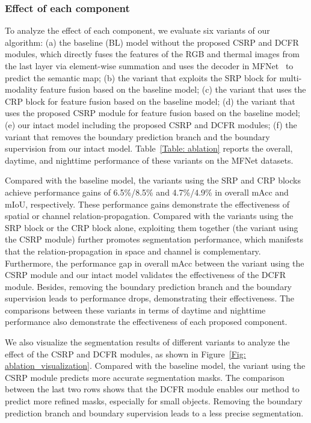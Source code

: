 \subsubsection{Effect of each component}
To analyze the effect of each component, we evaluate six variants of our algorithm: (a) the baseline (BL) model without the proposed CSRP and DCFR modules, which directly fuses the features of the RGB and thermal images from the last layer via element-wise summation and uses the decoder in MFNet~\cite{MFNet} to predict the semantic map; (b) the variant that exploits the SRP block for multi-modality feature fusion based on the baseline model; (c) the variant that uses the CRP block for feature fusion based on the baseline model; (d) the variant that uses the proposed CSRP module for feature fusion based on the baseline model; (e) our intact model including the proposed CSRP and DCFR modules; (f) the variant that removes the boundary prediction branch and the boundary supervision from our intact model. Table~\ref{Table: ablation} reports the overall, daytime, and nighttime performance of these variants on the MFNet datasets.

Compared with the baseline model, the variants using the SRP and CRP blocks achieve performance gains of 6.5\%/8.5\% and 4.7\%/4.9\% in overall mAcc and mIoU, respectively. These performance gains demonstrate the effectiveness of spatial or channel relation-propagation. Compared with the variants using the SRP block or the CRP block alone, exploiting them together (the variant using the CSRP module) further promotes segmentation performance, which manifests that the relation-propagation in space and channel is complementary. Furthermore, the performance gap in overall mAcc between the variant using the CSRP module and our intact model validates the effectiveness of the DCFR module. Besides, removing the boundary prediction branch and the boundary supervision leads to performance drops, demonstrating their effectiveness. The comparisons between these variants in terms of daytime and nighttime performance also demonstrate the effectiveness of each proposed component.

We also visualize the segmentation results of different variants to analyze the effect of the CSRP and DCFR modules, as shown in Figure~\ref{Fig: ablation_visualization}. Compared with the baseline model, the variant using the CSRP module predicts more accurate segmentation masks. The comparison between the last two rows shows that the DCFR module enables our method to predict more refined masks, especially for small objects. Removing the boundary prediction branch and boundary supervision leads to a less precise segmentation.

